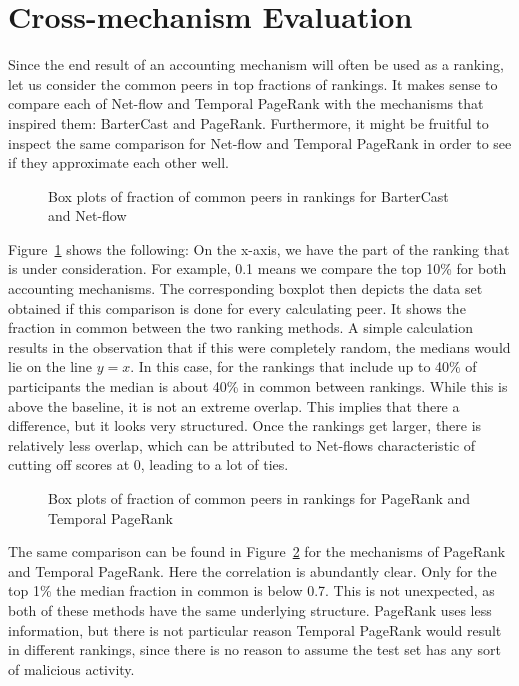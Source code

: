 \documentclass[a4paper,11pt]{book}
\theoremstyle{definition}
\begin{document}
\section{Cross-mechanism Evaluation}

Since the end result of an accounting mechanism will often be used as a ranking, let us
consider the common peers in top fractions of rankings. It makes sense to compare each
of Net-flow and Temporal PageRank with the mechanisms that inspired them: BarterCast
and PageRank. Furthermore, it might be fruitful to inspect the same comparison for
Net-flow and Temporal PageRank in order to see if they approximate each other well.

\begin{figure}[ht]
    \centering
    
    \caption{Box plots of fraction of common peers in rankings for BarterCast and Net-flow}
    \label{fig:box_bc_netflow}
\end{figure}

Figure~\ref{fig:box_bc_netflow} shows the following: On the x-axis, we have the part
of the ranking that is under consideration. For example, 0.1 means we compare the
top 10\% for both accounting mechanisms. The corresponding boxplot then depicts
the data set obtained if this comparison is done for every calculating peer. It shows
the fraction in common between the two ranking methods. A simple calculation results
in the observation that if this were completely random, the medians would lie on
the line $y=x$. In this case, for the rankings that include up to 40\% of participants
the median is about 40\% in common between rankings. While this is above the baseline,
it is not an extreme overlap. This implies that there a difference, but it looks very
structured. Once the rankings get larger, there is relatively less overlap, which
can be attributed to Net-flows characteristic of cutting off scores at 0, leading
to a lot of ties.


\begin{figure}[ht]
    \centering
    
    \caption{Box plots of fraction of common peers in rankings for PageRank and Temporal PageRank}
    \label{fig:box_pr_tpr}
\end{figure}

The same comparison can be found in Figure~\ref{fig:box_pr_tpr} for the mechanisms of PageRank
and Temporal PageRank. Here the correlation is abundantly clear. Only for the top 1\% the
median fraction in common is below 0.7. This is not unexpected, as both of these methods
have the same underlying structure. PageRank uses less information, but there is not particular
reason Temporal PageRank would result in different rankings, since there is no reason to
assume the test set has any sort of malicious activity.
\end{document}
